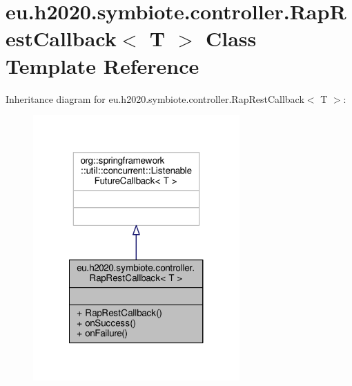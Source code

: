 \hypertarget{classeu_1_1h2020_1_1symbiote_1_1controller_1_1RapRestCallback}{}\section{eu.\+h2020.\+symbiote.\+controller.\+Rap\+Rest\+Callback$<$ T $>$ Class Template Reference}
\label{classeu_1_1h2020_1_1symbiote_1_1controller_1_1RapRestCallback}


Inheritance diagram for eu.\+h2020.\+symbiote.\+controller.\+Rap\+Rest\+Callback$<$ T $>$\+:
\nopagebreak
\begin{figure}[H]
\begin{center}
\leavevmode
\includegraphics[width=224pt]{classeu_1_1h2020_1_1symbiote_1_1controller_1_1RapRestCallback__inherit__graph}
\end{center}
\end{figure}


